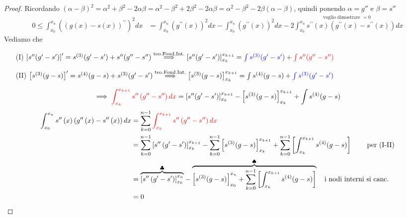 \documentclass[a4paper,10pt]{article}
\theoremstyle{definition}
\theoremstyle{indentdefinition}
\theoremstyle{indenttheorem}
\theoremstyle{myremark}
\theoremstyle{indentgeneral}
\theoremstyle{plain}
\theoremstyle{plain}
\begin{document}
\begin{proof} Ricordando $(\alpha-\beta)^2=\alpha^2+\beta^2-2\alpha\beta=\alpha^2-\beta^2+2\beta^2-2\alpha\beta=\alpha^2-\beta^2-2\beta(\alpha-\beta)$, quindi ponendo $\alpha=g''$ e $\beta=s''$
\begin{align*}
0\leq\int_{x_{0}}^{x_{n}}\left(\left(g\left(x\right)-s\left(x\right)\right)^{\prime\prime}\right)^{2}dx & =\int_{x_{0}}^{x_{n}}\left(g^{\prime\prime}\left(x\right)\right)^{2}dx-\int_{x_{0}}^{x_{n}}\left(g^{\prime\prime}\left(x\right)\right)^{2}dx-\overset{\text{voglio dimostrare }=0}{\boxed{2\int_{x_{0}}^{x_{n}}s^{\prime\prime}\left(x\right)\left(g^{\prime\prime}\left(x\right)-s^{\prime\prime}\left(x\right)\right)dx}}
\end{align*}
Vediamo che 
\begin{itemize}
    \item[(I)] $\left[s''(g'-s')\right]'=s^{(3)}(g'-s')+s''(g''-s'')\overset{\text{teo.Fond.Int.}}{\implies} \left[s''(g'-s')\right]_{x_k}^{x_{k+1}}=\textcolor{blue}{\int s^{(3)}(g'-s')}+\textcolor{red}{\int s''(g''-s'')}$
     \item[(II)] $\left[s^{(3)}(g-s)\right]'=s^{(4)}(g-s)+s^{(3)}(g'-s')\overset{\text{teo.Fond.Int.}}{\implies} \left[s^{(3)}(g-s)\right]_{x_k}^{x_{k+1}}=\int s^{(4)}(g-s)+\textcolor{blue}{\int s^{(3)}(g'-s')}$
\end{itemize}
$$\implies\textcolor{red}{\int_{x_{k}}^{x_{k+1}}s^{\prime\prime}\left(g^{\prime\prime}-s^{\prime\prime}\right)dx}= \left[s''(g'-s')\right]_{x_k}^{x_{k+1}}-\left[s^{(3)}(g-s)\right]_{x_k}^{x_{k+1}}+\int s^{(4)}(g-s)$$
\begin{align*}
\int_{x_{0}}^{x_{n}}s^{\prime\prime}\left(x\right)\left(g^{\prime\prime}\left(x\right)-s^{\prime\prime}\left(x\right)\right)dx &=\sum_{k=0}^{n-1}\textcolor{red}{\int_{x_{k}}^{x_{k+1}}s^{\prime\prime}\left(g^{\prime\prime}-s^{\prime\prime}\right)dx}\\
&=\sum_{k=0}^{n-1} {{\left[s^{\prime\prime}\left(g^{\prime}-s^{\prime}\right)\right]_{x_{k}}^{x_{k+1}}}}-{{\sum_{k=0}^{n-1}\left[s^{(3)}(g-s)\right]_{x_k}^{x_{k+1}}+\sum_{k=0}^{n-1}\left[\int_{x_{k}}^{x_{k+1}}s^{(4)}(g-s)\right]}} \qquad \text{ per (I-II)} \\
&=\overset{\clubsuit}{\overbrace{\left[s^{\prime\prime}\left(g^{\prime}-s^{\prime}\right)\right]_{x_{0}}^{x_{n}}}}-\overbrace{{{\left[s^{(3)}(g-s)\right]_{x_0}^{x_{n}}+\sum_{k=0}^{n-1}\left[\int_{x_{k}}^{x_{k+1}}s^{(4)}(g-s)\right]}}}^{\spadesuit} \quad \text{i nodi interni si canc.} \\
&=0
\end{align*}


\end{proof}
\end{document}
